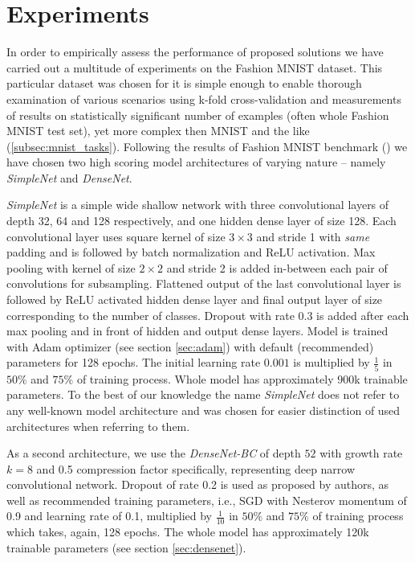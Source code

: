 \chapter{Experiments}
\label{sec:experiments}
In order to empirically assess the performance of proposed solutions we have carried out a multitude of experiments on the Fashion MNIST dataset. This particular dataset was chosen for it is simple enough to enable thorough examination of various scenarios using k-fold cross-validation and measurements of results on statistically significant number of examples (often whole Fashion MNIST test set), yet more complex then MNIST and the like (\ref{subsec:mnist_tasks}). Following the results of Fashion MNIST benchmark (\cite{FASHION_BENCH}) we have chosen two high scoring model architectures of varying nature -- namely \emph{SimpleNet} and \emph{DenseNet}.

\emph{SimpleNet} is a simple wide shallow network with three convolutional layers of depth 32, 64 and 128 respectively, and one hidden dense layer of size 128. Each convolutional layer uses square kernel of size $3 \times 3$ and stride 1 with \textit{same} padding and is followed by batch normalization and ReLU activation. Max pooling with kernel of size $2 \times 2$ and stride 2 is added in-between each pair of convolutions for subsampling. Flattened output of the last convolutional layer is followed by ReLU activated hidden dense layer and final output layer of size corresponding to the number of classes. Dropout with rate $0.3$ is added after each max pooling and in front of hidden and output dense layers. Model is trained with Adam optimizer (see section \ref{sec:adam}) with default (recommended) parameters for 128 epochs. The initial learning rate $0.001$ is multiplied by $\frac{1}{5}$ in $50\%$ and $75\%$ of training process. Whole model has approximately 900k trainable parameters. To the best of our knowledge the name \emph{SimpleNet} does not refer to any well-known model architecture and was chosen for easier distinction of used architectures when referring to them.

As a second architecture, we use the \emph{DenseNet-BC} of depth $52$ with growth rate $k=8$ and 0.5 compression factor specifically, representing deep narrow convolutional network. Dropout of rate 0.2 is used as proposed by authors, as well as recommended training parameters, i.e., SGD with Nesterov momentum of 0.9 and learning rate of 0.1, multiplied by $\frac{1}{10}$ in $50\%$ and $75\%$ of training process which takes, again, 128 epochs. The whole model has approximately 120k trainable parameters (see section \ref{sec:densenet}).

